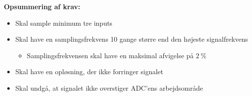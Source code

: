 \vspace{3mm}
\textbf{Opsummering af krav:}
\begin{itemize}
\item[\text{\sffamily \checkmark}] Skal sample minimum tre inputs 
\item[\text{\sffamily \checkmark}] Skal have en samplingsfrekvens 10 gange større end den højeste signalfrekvens
\begin{itemize}
\item Samplingsfrekvensen skal have en maksimal afvigelse på $2~\%$
\end{itemize}
\item[\text{\sffamily \checkmark}] Skal have en opløsning, der ikke forringer signalet
\item[\text{\sffamily \checkmark}] Skal undgå, at signalet ikke overstiger ADC'ens arbejdsområde
\end{itemize}

